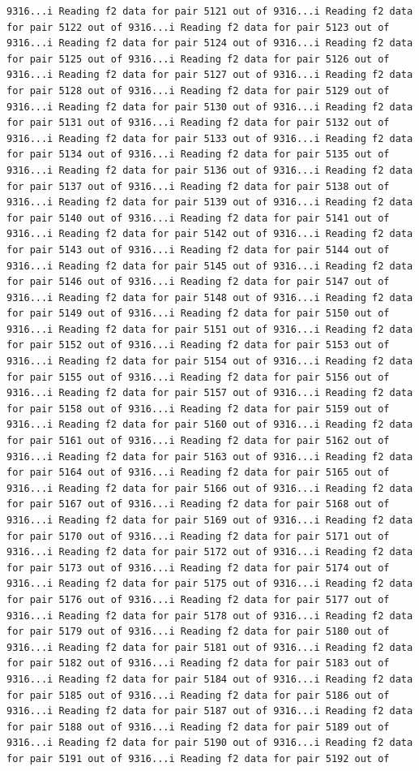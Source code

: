 \documentclass[
]{article}
\begin{document}
\begin{verbatim}
9316...i Reading f2 data for pair 5121 out of 9316...i Reading f2 data for pair 5122 out of 9316...i Reading f2 data for pair 5123 out of 9316...i Reading f2 data for pair 5124 out of 9316...i Reading f2 data for pair 5125 out of 9316...i Reading f2 data for pair 5126 out of 9316...i Reading f2 data for pair 5127 out of 9316...i Reading f2 data for pair 5128 out of 9316...i Reading f2 data for pair 5129 out of 9316...i Reading f2 data for pair 5130 out of 9316...i Reading f2 data for pair 5131 out of 9316...i Reading f2 data for pair 5132 out of 9316...i Reading f2 data for pair 5133 out of 9316...i Reading f2 data for pair 5134 out of 9316...i Reading f2 data for pair 5135 out of 9316...i Reading f2 data for pair 5136 out of 9316...i Reading f2 data for pair 5137 out of 9316...i Reading f2 data for pair 5138 out of 9316...i Reading f2 data for pair 5139 out of 9316...i Reading f2 data for pair 5140 out of 9316...i Reading f2 data for pair 5141 out of 9316...i Reading f2 data for pair 5142 out of 9316...i Reading f2 data for pair 5143 out of 9316...i Reading f2 data for pair 5144 out of 9316...i Reading f2 data for pair 5145 out of 9316...i Reading f2 data for pair 5146 out of 9316...i Reading f2 data for pair 5147 out of 9316...i Reading f2 data for pair 5148 out of 9316...i Reading f2 data for pair 5149 out of 9316...i Reading f2 data for pair 5150 out of 9316...i Reading f2 data for pair 5151 out of 9316...i Reading f2 data for pair 5152 out of 9316...i Reading f2 data for pair 5153 out of 9316...i Reading f2 data for pair 5154 out of 9316...i Reading f2 data for pair 5155 out of 9316...i Reading f2 data for pair 5156 out of 9316...i Reading f2 data for pair 5157 out of 9316...i Reading f2 data for pair 5158 out of 9316...i Reading f2 data for pair 5159 out of 9316...i Reading f2 data for pair 5160 out of 9316...i Reading f2 data for pair 5161 out of 9316...i Reading f2 data for pair 5162 out of 9316...i Reading f2 data for pair 5163 out of 9316...i Reading f2 data for pair 5164 out of 9316...i Reading f2 data for pair 5165 out of 9316...i Reading f2 data for pair 5166 out of 9316...i Reading f2 data for pair 5167 out of 9316...i Reading f2 data for pair 5168 out of 9316...i Reading f2 data for pair 5169 out of 9316...i Reading f2 data for pair 5170 out of 9316...i Reading f2 data for pair 5171 out of 9316...i Reading f2 data for pair 5172 out of 9316...i Reading f2 data for pair 5173 out of 9316...i Reading f2 data for pair 5174 out of 9316...i Reading f2 data for pair 5175 out of 9316...i Reading f2 data for pair 5176 out of 9316...i Reading f2 data for pair 5177 out of 9316...i Reading f2 data for pair 5178 out of 9316...i Reading f2 data for pair 5179 out of 9316...i Reading f2 data for pair 5180 out of 9316...i Reading f2 data for pair 5181 out of 9316...i Reading f2 data for pair 5182 out of 9316...i Reading f2 data for pair 5183 out of 9316...i Reading f2 data for pair 5184 out of 9316...i Reading f2 data for pair 5185 out of 9316...i Reading f2 data for pair 5186 out of 9316...i Reading f2 data for pair 5187 out of 9316...i Reading f2 data for pair 5188 out of 9316...i Reading f2 data for pair 5189 out of 9316...i Reading f2 data for pair 5190 out of 9316...i Reading f2 data for pair 5191 out of 9316...i Reading f2 data for pair 5192 out of 
\end{verbatim}
\end{document}
